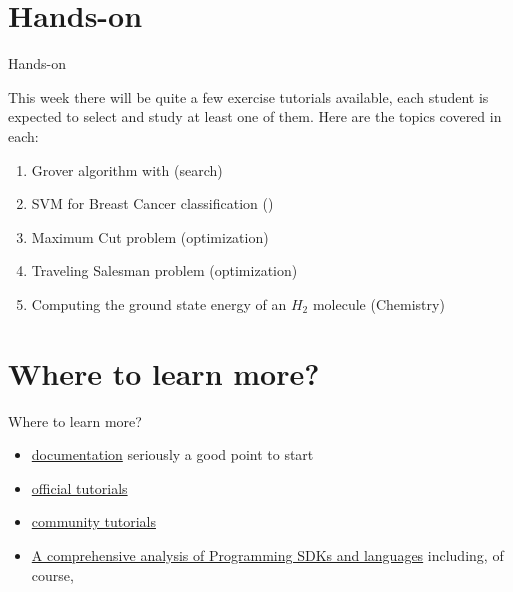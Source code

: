 \documentclass[aspectratio=43]{beamer}
\begin{document}
\section{Hands-on}
\begin{frame}{Hands-on}
\begin{card}
    This week there will be quite a few exercise tutorials available, each student is expected to select and study at least one of them. Here are the topics covered in each:
    \begin{enumerate}
        \item Grover algorithm with \qka (search)
        \item SVM for Breast Cancer classification (\ai)
        \item Maximum Cut problem (optimization)
        \item Traveling Salesman problem (optimization)
        \item Computing the ground state energy of an $H_2$ molecule (Chemistry)
    \end{enumerate}
\end{card}
\end{frame}


\section{Where to learn more?}
\begin{frame}{Where to learn more?}
\begin{card}
    \begin{itemize}
        \item \href{https://qiskit.org/documentation/aqua/index.html}{\qka documentation} seriously a good point to start
        \item \href{https://github.com/Qiskit/qiskit-tutorial/tree/master/qiskit/aqua}{\qka official tutorials}
        \item \href{https://github.com/Qiskit/qiskit-tutorial/tree/master/community/aqua}{\qka community tutorials}
        \item \href{https://en.wikipedia.org/wiki/Quantum_programming}{A comprehensive analysis of \q Programming SDKs and languages} including, of course, \qk
    \end{itemize}
\end{card}
\end{frame}
\end{document}
